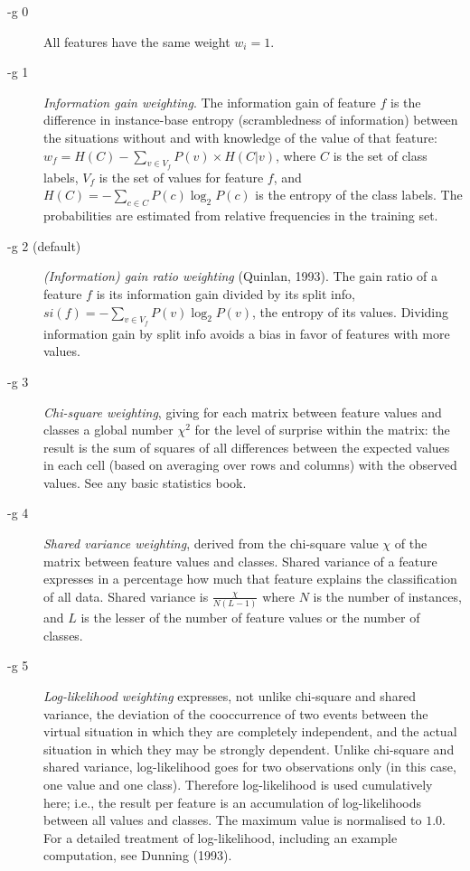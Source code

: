 \documentclass[11pt]{article}
\begin{document}
\begin{description}

\item[-g 0] All features have the same weight $w_{i}=1$.

\item[-g 1] {\em Information gain weighting}. The information gain of
feature $f$ is the difference in instance-base entropy (scrambledness
of information) between the situations without and with knowledge of
the value of that feature: $w_{f} = H(C) - \sum_{v \in V_{f}} P(v)
\times H(C|v)$, where $C$ is the set of class labels, $V_{f}$ is the
set of values for feature $f$, and $H(C) = - \sum_{c \in C} P(c)
\log_{2} P(c)$ is the entropy of the class labels. The probabilities
are estimated from relative frequencies in the training set.

\item[-g 2 (default)] {\em (Information) gain ratio weighting}
(Quinlan, 1993). The gain ratio of a feature $f$ is its information
gain divided by its split info, $si(f)= - \sum_{v \in V_{f}} P(v)
\log_{2} P(v)$, the entropy of its values. Dividing information gain
by split info avoids a bias in favor of features with more values.
\item[-g 3] {\em Chi-square weighting}, giving for each matrix between
feature values and classes a global number $\chi^{2}$ for the level of
surprise within the matrix: the result is the sum of squares of all
differences between the expected values in each cell (based on
averaging over rows and columns) with the observed values. See any
basic statistics book.

\item[-g 4] {\em Shared variance weighting}, derived from the
chi-square value $\chi$ of the matrix between feature values and
classes. Shared variance of a feature expresses in a percentage how
much that feature explains the classification of all data. Shared
variance is $\frac{\chi}{N (L - 1)}$ where $N$ is the number of
instances, and $L$ is the lesser of the number of feature values or
the number of classes.

\item[-g 5] {\em Log-likelihood weighting} expresses, not unlike
chi-square and shared variance, the deviation of the cooccurrence of
two events between the virtual situation in which they are completely
independent, and the actual situation in which they may be strongly
dependent. Unlike chi-square and shared variance, log-likelihood goes
for two observations only (in this case, one value and one
class). Therefore log-likelihood is used cumulatively here; i.e., the
result per feature is an accumulation of log-likelihoods between all
values and classes. The maximum value is normalised to $1.0$. For a
detailed treatment of log-likelihood, including an example
computation, see Dunning (1993).
\end{description}
\ \\
\end{document}
